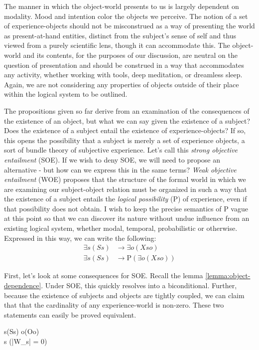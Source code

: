 \documentclass[leqno]{article}
\newcounter{lemma}
\begin{document}
	The manner in which the object-world presents to us is largely dependent on modality.
	Mood and intention color the objects we perceive. The notion of a set of experience-objects
	should not be misconstrued as a way of presenting the world as present-at-hand
	entities, distinct from the subject's sense of self and thus viewed from a
	purely scientific lens, though it can accommodate this. The object-world and
	its contents, for the purposes of our discussion, are neutral on the question
	of presentation and should be construed in a way that accommodates any
	activity, whether working with tools, deep meditation, or dreamless sleep.
	Again, we are not considering any properties of objects outside of their place
	within the logical system to be outlined.

	The propositions given so far derive from an examination of the consequences of
	the existence of an object, but what we can say given the existence of a
	subject? Does the existence of a subject entail the existence of experience-objects?
	If so, this opens the possibility that a subject is merely a set of experience
	objects, a sort of bundle theory of subjective experience. Let's call this \emph{strong
	objective entailment} (SOE). If we wish to deny SOE, we will need to propose
	an alternative - but how can we express this in the same terms? \emph{Weak
	objective entailment} (WOE) proposes that the structure of the formal world in
	which we are examining our subject-object relation must be organized in such a
	way that the existence of a subject entails the \emph{logical possibility} ($\mathrm{P}$)
	of experience, even if that possibility does not obtain. I wish to keep the precise
	semantics of $\mathrm{P}$ vague at this point so that we can discover its nature
	without undue influence from an existing logical system, whether modal, temporal,
	probabilistic or otherwise. Expressed in this way, we can write the following:
	\begin{align}
		\label{def:soe}\tag{SOE}\exists s (Ss) & \rightarrow \exists o (Xso)            \\
		\label{def:woe}\tag{WOE}\exists s (Ss) & \rightarrow \mathrm{P}(\exists o(Xso))
	\end{align}

	First, let's look at some consequences for SOE. Recall the lemma \eqref{lemma:object-dependence}.
	Under SOE, this quickly resolves into a biconditional. Further, because the existence
	of subjects and objects are tightly coupled, we can claim that that the
	cardinality of any experience-world is non-zero. These two statements can easily
	be proved equivalent.
	\begin{lemmalist}
		[SOE.][soe] \label{lemma:soe1} \exists s(Ss) \leftrightarrow \exists o(Oo) \\
		\label{lemma:soe2} \forall s (|W_s| \not= 0)
	\end{lemmalist}
\end{document}
